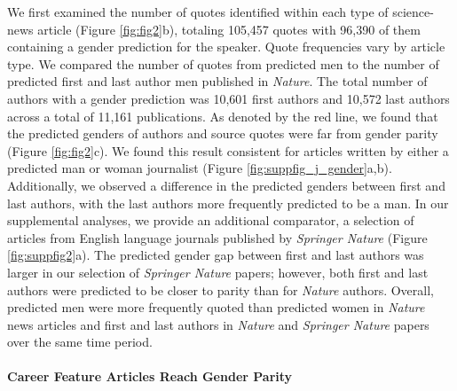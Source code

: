 We first examined the number of quotes identified within each type of science-news article (Figure \ref{fig:fig2}b), totaling 105,457 quotes with 96,390 of them containing a gender prediction for the speaker.
Quote frequencies vary by article type.
We compared the number of quotes from predicted men to the number of predicted first and last author men published in \emph{Nature}.
The total number of authors with a gender prediction was 10,601 first authors and 10,572 last authors across a total of 11,161 publications.
As denoted by the red line, we found that the predicted genders of authors and source quotes were far from gender parity (Figure \ref{fig:fig2}c).
We found this result consistent for articles written by either a predicted man or woman journalist (Figure \ref{fig:suppfig_j_gender}a,b).
Additionally, we observed a difference in the predicted genders between first and last authors, with the last authors more frequently predicted to be a man.
In our supplemental analyses, we provide an additional comparator, a selection of articles from English language journals published by \emph{Springer Nature} (Figure \ref{fig:suppfig2}a).
The predicted gender gap between first and last authors was larger in our selection of \emph{Springer Nature} papers; however, both first and last authors were predicted to be closer to parity than for \emph{Nature} authors.
Overall, predicted men were more frequently quoted than predicted women in \emph{Nature} news articles and first and last authors in \emph{Nature} and \emph{Springer Nature} papers over the same time period.

\hypertarget{career-feature-articles-reach-gender-parity}{%
\paragraph{Career Feature Articles Reach Gender Parity}\label{career-feature-articles-reach-gender-parity}}


